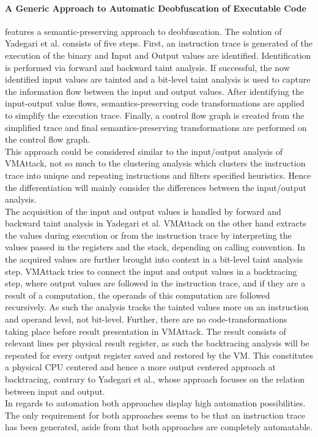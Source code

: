 \documentclass[10pt,twoside,a4paper,bibliography=totoc]{scrbook}
\begin{document}
\paragraph*{A Generic Approach to Automatic Deobfuscation of Executable Code}features a semantic-preserving approach to deobfuscation. The solution of Yadegari et al. consists of five steps. 
First, an instruction trace is generated of the execution of the binary and Input and Output values are identified. Identification is performed via forward and backward taint analysis. If successful, the now identified input values are tainted and a bit-level taint analysis is used to capture the information flow between the input and output values.
After identifying the input-output value flows, semantics-preserving  code transformations are applied to simplify the execution trace.
Finally, a control flow graph is created from the simplified trace and final semantics-preserving transformations are performed on the control flow graph.\\
This approach could be considered similar to the input/output analysis of VMAttack, not so much to the clustering analysis which clusters the instruction trace into unique and repeating instructions and filters specified heuristics. 
Hence the differentiation will mainly consider the differences between the input/output analysis.\\
The acquisition of the input and output values is handled by forward and backward taint analysis in Yadegari et al. 
VMAttack on the other hand extracts the values during execution or from the instruction trace by interpreting the values passed in the registers and the stack, depending on calling convention.
In \cite{DBLP:conf/sp/YadegariJWD15} the acquired values are further brought into context in a bit-level taint analysis step.
VMAttack tries to connect the input and output values in a backtracing step, where output values are followed in the instruction trace, and if they are a result of a computation, the operands of this computation are followed recursively. As such the analysis tracks the tainted values more on an instruction and operand level, not bit-level.
Further, there are no code-transformations taking place before result presentation in VMAttack. The result consists of relevant lines per physical result register, as such the backtracing analysis will be repeated for every output register saved and restored by the VM.
This constitutes a physical CPU centered and hence a more output centered approach at backtracing, contrary to Yadegari et al., whose approach focuses on the relation between input and output.\\
In regards to automation both approaches display high automation possibilities. The only requirement for both approaches seems to be that an instruction trace has been generated, aside from that both approaches are completely automatable.
\end{document}
